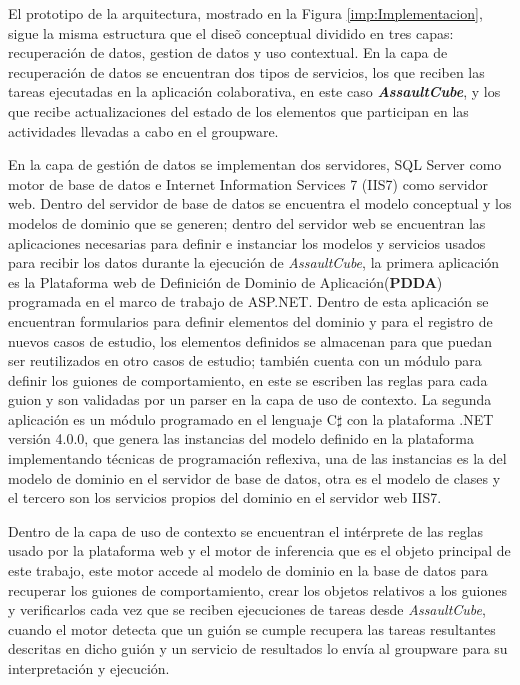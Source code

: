 El prototipo de la arquitectura, mostrado en la Figura \ref{imp:Implementacion}, sigue la misma estructura que el dise\~o conceptual dividido en tres capas: recuperaci\'on de datos, gestion de datos y uso contextual. En la capa de recuperaci\'on de datos se encuentran dos tipos de servicios, los que reciben las tareas ejecutadas en la aplicaci\'on colaborativa, en este caso \textbf{\textit{AssaultCube}}, y los que recibe actualizaciones del estado de los elementos que participan en las actividades llevadas a cabo en el groupware.

En la capa de gesti\'on de datos  se implementan dos servidores, SQL Server como motor de base de datos e Internet Information Services 7 (IIS7) como servidor web. Dentro del servidor de base de datos se encuentra el  modelo conceptual y los modelos de dominio que se generen; dentro del servidor web se encuentran las aplicaciones necesarias para definir e instanciar los modelos y servicios usados para recibir los datos durante la ejecuci\'on de \textit{AssaultCube}, la primera aplicaci\'on es la Plataforma web de Definici\'on de Dominio de Aplicaci\'on(\textbf{PDDA})  programada en el marco de trabajo de ASP.NET. Dentro de esta aplicaci\'on se encuentran formularios para definir elementos del dominio y para el registro de nuevos casos de estudio, los elementos definidos se almacenan para que puedan ser reutilizados en otro casos de estudio; tambi\'en cuenta con un m\'odulo para definir los guiones de comportamiento, en este se escriben las reglas para cada guion y son validadas por un parser en la capa de uso de contexto. La segunda aplicaci\'on es un m\'odulo programado en el lenguaje C$\sharp$ con la plataforma .NET versi\'on 4.0.0,  que genera las instancias del modelo definido en la plataforma implementando t\'ecnicas de programaci\'on reflexiva, una de las instancias es la del modelo de dominio en el servidor de base de datos, otra es el modelo de clases y el tercero son los servicios propios del dominio en el servidor web IIS7. 

Dentro de la capa de uso de contexto se encuentran el int\'erprete de las reglas usado por la plataforma web y el motor de inferencia que es el objeto principal de este trabajo, este motor accede al modelo de dominio en la base de datos para recuperar los guiones de comportamiento, crear los objetos relativos a los guiones y verificarlos cada vez que se reciben ejecuciones de tareas desde \textit{AssaultCube}, cuando el motor detecta que un gui\'on se cumple recupera las tareas resultantes descritas en dicho gui\'on y un servicio de resultados lo env\'ia al groupware para su interpretaci\'on y ejecuci\'on. 

